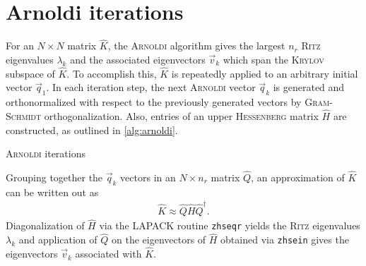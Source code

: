 \section{Arnoldi iterations}
\label{app:Arnoldi}

For an $N \times N$ matrix $\hat{K}$, the \textsc{Arnoldi} algorithm gives the largest $n_{r}$ \textsc{Ritz} eigenvalues $\lambda_{k}$  and the associated eigenvectors $\vec{v}_{k}$ which span the \textsc{Krylov} subspace of $\hat{K}$. To accomplish this, $\hat{K}$ is repeatedly applied to an arbitrary initial vector $\vec{q}_{1}$. In each iteration step, the next \textsc{Arnoldi} vector $\vec{q}_{k}$ is generated and orthonormalized with respect to the previously generated vectors by \textsc{Gram}-\textsc{Schmidt} orthogonalization. Also, entries of an upper \textsc{Hessenberg} matrix $\hat{H}$ are constructed, as outlined in \cref{alg:arnoldi}.
\begin{algorithm}
  \caption{\textsc{Arnoldi} iterations}
  \label{alg:arnoldi}
  \begin{algorithmic}[1]
      \EndFor
    \EndFor
  \end{algorithmic}
\end{algorithm}
Grouping together the $\vec{q}_{k}$ vectors in an $N \times n_{r}$ matrix $\hat{Q}$, an approximation of $\hat{K}$ can be written out as
\begin{gather}
  \hat{K} \approx \hat{Q} \hat{H} \hat{Q}^{\dagger}.
\end{gather}
Diagonalization of $\hat{H}$ via the LAPACK routine \texttt{zhseqr} yields the \textsc{Ritz} eigenvalues $\lambda_{k}$ and application of $\hat{Q}$ on the eigenvectors of $\hat{H}$ obtained via \texttt{zhsein} gives the eigenvectors $\vec{v}_{k}$ associated with $\hat{K}$.

